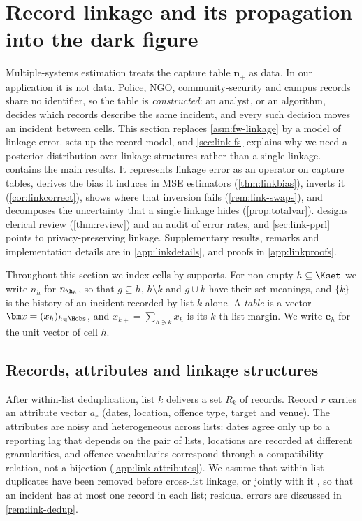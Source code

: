 \section{Record linkage and its propagation into the dark figure}\label{sec:linkage}

Multiple-systems estimation treats the capture table $\bm n_+$ as data. In our application it is not data. Police, NGO, community-security and campus records share no identifier, so the table is \emph{constructed}: an analyst, or an algorithm, decides which records describe the same incident, and every such decision moves an incident between cells. This section replaces \cref{asm:fw-linkage} by a model of linkage error.  sets up the record model, and \cref{sec:link-fs} explains why we need a posterior distribution over linkage structures rather than a single linkage.  contains the main results. It represents linkage error as an operator on capture tables, derives the bias it induces in MSE estimators (\cref{thm:linkbias}), inverts it (\cref{cor:linkcorrect}), shows where that inversion fails (\cref{rem:link-swaps}), and decomposes the uncertainty that a single linkage hides (\cref{prop:totalvar}).  designs clerical review (\cref{thm:review}) and an audit of error rates, and \cref{sec:link-pprl} points to privacy-preserving linkage. Supplementary results, remarks and implementation details are in \cref{app:linkdetails}, and proofs in \cref{app:linkproofs}.

Throughout this section we index cells by supports. For non-empty $h\subseteq\Kset$ we write $n_h$ for $n_{\h_h}$, so that $g\subseteq h$, $h\setminus k$ and $g\cup k$ have their set meanings, and $\{k\}$ is the history of an incident recorded by list $k$ alone. A \emph{table} is a vector $\bm x=(x_h)_{h\in\Hobs}$, and $x_{k+}=\sum_{h\ni k}x_h$ is its $k$-th list margin. We write $\bm e_h$ for the unit vector of cell $h$.

\subsection{Records, attributes and linkage structures}\label{sec:link-records}

After within-list deduplication, list $k$ delivers a set $R_k$ of records. Record $r$ carries an attribute vector $a_r$ (dates, location, offence type, target and venue). The attributes are noisy and heterogeneous across lists: dates agree only up to a reporting lag that depends on the pair of lists, locations are recorded at different granularities, and offence vocabularies correspond through a compatibility relation, not a bijection (\cref{app:link-attributes}). We assume that within-list duplicates have been removed before cross-list linkage, or jointly with it \citep{steorts2016}, so that an incident has at most one record in each list; residual errors are discussed in \cref{rem:link-dedup}.

